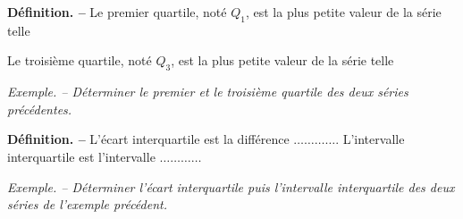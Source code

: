 \documentclass[handout]{beamer}
\begin{document}
\begin{frame}
  \textbf{Définition. --} Le premier quartile, noté $Q_1$, est la plus petite valeur de la série telle \dotfill\\\dotfill

  \smallskip

  Le troisième quartile, noté $Q_3$, est la plus petite valeur de la série telle
  \dotfill\\\dotfill

  \bigskip
  
  \textit{Exemple. -- Déterminer le premier et le troisième quartile des deux séries précédentes.}
\end{frame}

\begin{frame}
  \textbf{Définition. --} L'écart interquartile est la différence $\hdots\hdots\hdots\hdots$. L'intervalle interquartile est l'intervalle $\hdots\hdots\hdots\hdots$

  \bigskip

  \textit{Exemple. -- Déterminer l'écart interquartile puis l'intervalle interquartile des deux séries de l'exemple précédent.}
\end{frame}
\end{document}
